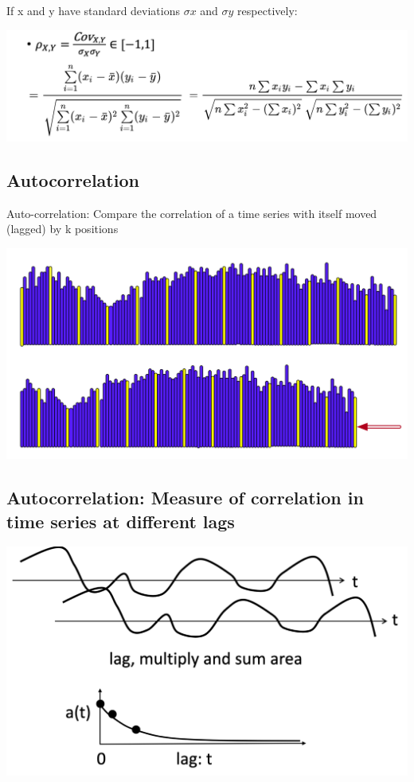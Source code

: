 \documentclass[11pt]{article}
\theoremstyle{definition}
\begin{document}
If x and y have standard deviations $\sigma x$ and $\sigma y$ respectively:

\includegraphics[width=\textwidth/2]{6.png}

\subsection{Autocorrelation}
Auto-correlation: Compare the correlation of a time series with itself
moved (lagged) by k positions

\includegraphics[width=\textwidth/2]{7.png}

\subsection{Autocorrelation:
Measure of correlation in time series
at different lags}
\includegraphics[width=\textwidth/2]{8.png}
\end{document}
